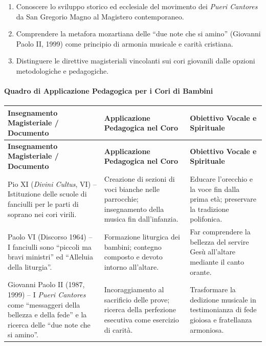 \documentclass[12pt,a4paper]{article}
\begin{document}
	\begin{enumerate}[label=\arabic*.,leftmargin=*]
		\item Conoscere lo sviluppo storico ed ecclesiale del movimento dei \emph{Pueri Cantores} da San Gregorio Magno al Magistero contemporaneo.
		\item Comprendere la metafora mozartiana delle ``due note che si amino'' (Giovanni Paolo II, 1999) come principio di armonia musicale e carità cristiana.
		\item Distinguere le direttive magisteriali vincolanti sui cori giovanili dalle opzioni metodologiche e pedagogiche.
	\end{enumerate}
	
	\paragraph{Quadro di Applicazione Pedagogica per i Cori di Bambini}\label{quadro-di-applicazione-pedagogica-per-i-cori-di-bambini}
	
	\begin{longtable}{L{3.5cm}L{4.5cm}L{4.5cm}}
		\toprule
		\textbf{Insegnamento Magisteriale / Documento} & \textbf{Applicazione Pedagogica nel Coro} & \textbf{Obiettivo Vocale e Spirituale} \\
		\midrule
		\endfirsthead
		\toprule
		\textbf{Insegnamento Magisteriale / Documento} & \textbf{Applicazione Pedagogica nel Coro} & \textbf{Obiettivo Vocale e Spirituale} \\
		\midrule
		\endhead
		\bottomrule
		\endlastfoot
		Pio XI (\emph{Divini Cultus}, VI) -- Istituzione delle scuole di fanciulli per le parti di soprano nei cori virili. & Creazione di sezioni di voci bianche nelle parrocchie; insegnamento della musica fin dall'infanzia. & Educare l'orecchio e la voce fin dalla prima età; preservare la tradizione polifonica. \\
		Paolo VI (Discorso 1964) -- I fanciulli sono ``piccoli ma bravi ministri'' ed ``Alleluia della liturgia''. & Formazione liturgica dei bambini; contegno composto e devoto intorno all'altare. & Far comprendere la bellezza del servire Gesù all'altare mediante il canto orante. \\
		Giovanni Paolo II (1987, 1999) -- I \emph{Pueri Cantores} come ``messaggeri della bellezza e della fede'' e la ricerca delle ``due note che si amino''. & Incoraggiamento al sacrificio delle prove; ricerca della perfezione esecutiva come esercizio di carità. & Trasformare la dedizione musicale in testimonianza di fede gioiosa e fratellanza armoniosa. \\
	\end{longtable}
	
\end{document}
